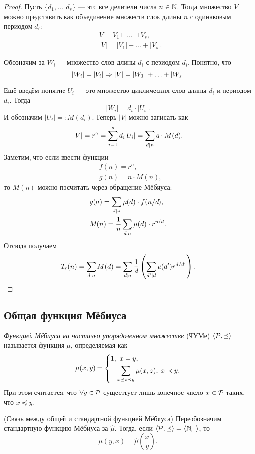 \begin{proof}
	Пусть $\{d_1, \ldots, d_s\}$ --- это все делители числа $n \in \mathbb{N}$. Тогда множество $V$ можно представить как объединение множеств слов длины $n$ с одинаковым периодом $d_i$:
	\begin{align*}
		&V = V_1 \sqcup \ldots \sqcup V_s,
		\\
		&|V| = |V_1| + \ldots + |V_s|.
	\end{align*}
	
	Обозначим за $W_i$ --- множество слов длины $d_i$ с периодом $d_i$. Понятно, что
	\[
		|W_i| = |V_i| \Rightarrow |V| = |W_1| + \ldots + |W_s|
	\]
	
	Ещё введём понятие $U_i$ --- это множество циклических слов длины $d_i$ и периодом $d_i$. Тогда
	\[
		|W_i| = d_i \cdot |U_i|.
	\]
	И обозначим $|U_i| =: M(d_i)$. Теперь $|V|$ можно записать как
	\[
		|V| = r^n = \sum\limits_{i = 1}^s d_i |U_i| = \sum\limits_{d \mid n} d \cdot M(d).
	\]
	Заметим, что если ввести функции
	\begin{align*}
		&f(n) = r^n,
		\\
		&g(n) = n \cdot M(n),
	\end{align*}
	то $M(n)$ можно посчитать через обращение Мёбиуса:
	\begin{align*}
		&g(n) = \sum\limits_{d \mid n} \mu(d) \cdot f(n / d),
		\\
		&M(n) = \frac{1}{n}\sum\limits_{d \mid n} \mu(d) \cdot r^{n / d}.
	\end{align*}
	Отсюда получаем
	\[
		T_r(n) = \sum\limits_{d \mid n} M(d) = \sum\limits_{d \mid n} \frac{1}{d} \left(\sum\limits_{d' \mid d} \mu(d') r^{d / d'}\right).
	\]
\end{proof}

\subsection{Общая функция Мёбиуса}

\begin{definition}
	 \textit{Функцией Мёбиуса на частично упорядоченном множестве} (ЧУМе) $\langle\mathcal{P}, \preceq\rangle$ называется функция $\mu$, определяемая как
	 \[
	 	\mu(x, y) = \left\{\begin{aligned}
	 		&{1,\ x = y,}
	 		\\
	 		&{-\sum\limits_{x \preceq z \prec y} \mu(x, z),\ x \prec y.}
 		\end{aligned}\right.
	 \]
	 При этом считается, что $\forall y \in \mathcal{P}$ существует лишь конечное число $x \in \mathcal{P}$ таких, что $x \preceq y$.
\end{definition}

\begin{theorem} (Связь между общей и стандартной функцией Мёбиуса)
	Переобозначим стандартную функцию Мёбиуса за $\hat{\mu}$. Тогда, если $\langle\mathcal{P}, \preceq\rangle = \langle\mathbb{N}, |\rangle$, то
	\[
		\mu(y, x) = \hat{\mu}\left(\frac{x}{y}\right).
	\]
\end{theorem}


